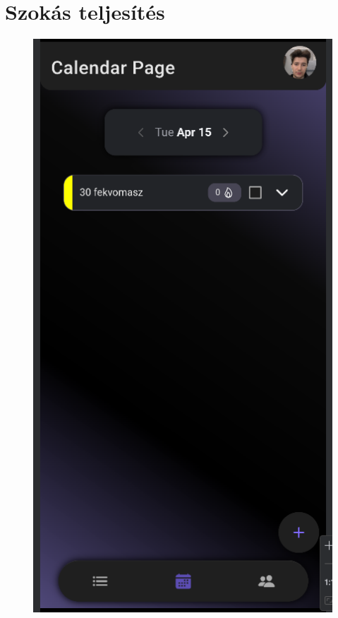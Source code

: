 \documentclass[12pt]{report}
\begin{document}
\section{Szokás teljesítés}
\begin{figure}[H]
    \centering

    \begin{minipage}[b]{0.3\textwidth}
        \centering
        \includegraphics[width=\linewidth]{src/habitdone1.png}

\end{minipage}
\end{figure}
\end{document}
